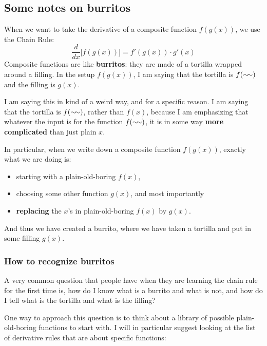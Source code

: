 
\setlength{\parskip}{.2cm}
\newcommand{\squiggle}{\sim\mkern-4mu\sim}
\renewcommand{\blue}[1]{\textcolor{blue}{\boxed{#1}}}


\begin{center}
    \subsection*{Some notes on burritos}
\end{center}

When we want to take the derivative of a composite function $f(g(x))$, we use the Chain Rule:
\[\dfrac{d}{dx}\Big[f(g(x))\Big] = f'(g(x)) \cdot g'(x)\]
Composite functions are like \textbf{burritos}: they are made of a tortilla wrapped around a filling. In the setup $f(g(x))$, I am saying that the tortilla is $f(\squiggle)$ and the filling is $g(x)$.

I am saying this in kind of a weird way, and for a specific reason. I am saying that the tortilla is $f(\squiggle)$, rather than $f(x)$, because I am emphasizing that whatever the input is for the function $f(\squiggle)$, it is in some way \textbf{more complicated} than just plain $x$.

In particular, when we write down a composite function $f(g(x))$, exactly what we are doing is:
\begin{itemize}
    \item starting with a plain-old-boring $f(x)$,
    \item choosing some other function $g(x)$, and most importantly
    \item \textbf{replacing} the $x$'s in plain-old-boring $f(x)$ by $g(x)$.
\end{itemize}
And thus we have created a burrito, where we have taken a tortilla and put in some filling $g(x)$.

\subsubsection*{How to recognize burritos}

A very common question that people have when they are learning the chain rule for the first time is, how do I know what is a burrito and what is not, and how do I tell what is the tortilla and what is the filling?

One way to approach this question is to think about a library of possible plain-old-boring functions to start with. I will in particular suggest looking at the list of derivative rules that are about specific functions: 

